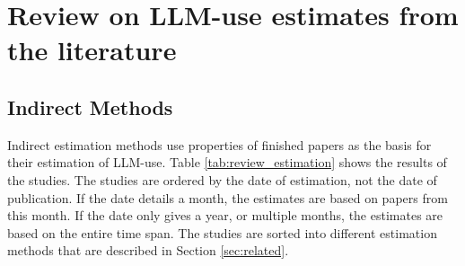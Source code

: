 \chapter{Review on LLM-use estimates from the literature}
\section{Indirect Methods}
Indirect estimation methods use properties of finished papers as the basis for their estimation of LLM-use.
Table \ref{tab:review_estimation} shows the results of the studies.
The studies are ordered by the date of estimation, not the date of publication.
If the date details a month, the estimates are based on papers from this month.
If the date only gives a year, or multiple months, the estimates are based on the entire time span.
The studies are sorted into different estimation methods that are described in Section \ref{sec:related}.

